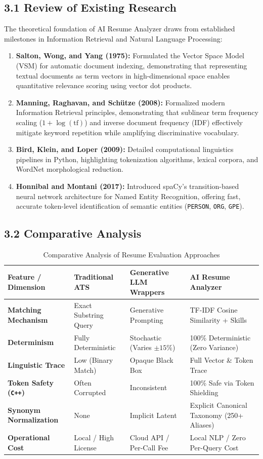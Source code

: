 \documentclass[11pt,a4paper]{article}
\begin{document}
\subsection{3.1 Review of Existing Research}
The theoretical foundation of AI Resume Analyzer draws from established milestones in Information Retrieval and Natural Language Processing:
\begin{enumerate}[noitemsep]
    \item \textbf{Salton, Wong, and Yang (1975):} Formulated the Vector Space Model (VSM) for automatic document indexing, demonstrating that representing textual documents as term vectors in high-dimensional space enables quantitative relevance scoring using vector dot products.
    \item \textbf{Manning, Raghavan, and Schütze (2008):} Formalized modern Information Retrieval principles, demonstrating that sublinear term frequency scaling ($1 + \log(\text{tf})$) and inverse document frequency (IDF) effectively mitigate keyword repetition while amplifying discriminative vocabulary.
    \item \textbf{Bird, Klein, and Loper (2009):} Detailed computational linguistics pipelines in Python, highlighting tokenization algorithms, lexical corpora, and WordNet morphological reduction.
    \item \textbf{Honnibal and Montani (2017):} Introduced spaCy's transition-based neural network architecture for Named Entity Recognition, offering fast, accurate token-level identification of semantic entities (\texttt{PERSON}, \texttt{ORG}, \texttt{GPE}).
\end{enumerate}

\subsection{3.2 Comparative Analysis}
\begin{table}[h!]
\centering
\small
\begin{tabularx}{\textwidth}{lXXX}
\toprule
\textbf{Feature / Dimension} & \textbf{Traditional ATS} & \textbf{Generative LLM Wrappers} & \textbf{AI Resume Analyzer} \\
\midrule
\textbf{Matching Mechanism} & Exact Substring Query & Generative Prompting & TF-IDF Cosine Similarity + Skills \\
\textbf{Determinism} & Fully Deterministic & Stochastic (Varies $\pm 15\%$) & 100\% Deterministic (Zero Variance) \\
\textbf{Linguistic Trace} & Low (Binary Match) & Opaque Black Box & Full Vector \& Token Trace \\
\textbf{Token Safety (\texttt{C++})} & Often Corrupted & Inconsistent & 100\% Safe via Token Shielding \\
\textbf{Synonym Normalization} & None & Implicit Latent & Explicit Canonical Taxonomy (250+ Aliases) \\
\textbf{Operational Cost} & Local / High License & Cloud API / Per-Call Fee & Local NLP / Zero Per-Query Cost \\
\bottomrule
\end{tabularx}
\caption{Comparative Analysis of Resume Evaluation Approaches}
\end{table}
\end{document}
